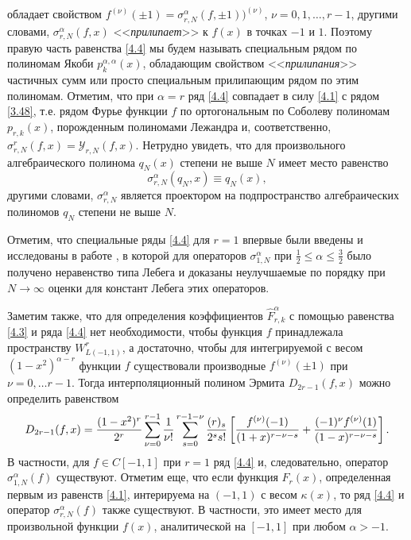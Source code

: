 обладает свойством $f^{(\nu)}(\pm1)=\sigma_{r,N}^\alpha(f,\pm1))^{(\nu)}$, $\nu=0,1,\ldots, r-1$, другими словами, $\sigma_{r,N}^\alpha(f,x)$ <<\textit{прилипает}>> к $f(x)$ в точках $-1$ и $1$. Поэтому правую часть  равенства \eqref{4.4} мы будем называть специальным рядом по полиномам Якоби $p_{k}^{\alpha,\alpha}(x)$, обладающим свойством <<\textit{прилипания}>> частичных сумм или просто специальным прилипающим рядом по этим  полиномам.  Отметим, что при $\alpha=r$ ряд \eqref{4.4} совпадает в силу \eqref{4.1} с рядом \eqref{3.48}, т.е. рядом Фурье функции $f$ по ортогональным по Соболеву полиномам $p_{r,k}(x)$, порожденным полиномами Лежандра и, соответственно, $\sigma_{r,N}^r(f,x)=\mathcal{ Y}_{r,N}(f,x)$. Нетрудно увидеть, что для произвольного алгебраического полинома $q_N(x)$ степени не выше $N$ имеет место равенство
\begin{equation}\label{4.6}
\sigma_{r,N}^\alpha(q_N,x)\equiv q_N(x),
\end{equation}
другими словами, $\sigma_{r,N}^\alpha$ является проектором на подпространство алгебраических полиномов $q_N$ степени не выше $N$.

Отметим, что специальные ряды \eqref{4.4} для $r=1$ впервые были введены и исследованы в работе \cite{sharap3}, в которой для операторов $\sigma_{1,N}^\alpha$  при $\frac12\le \alpha\le\frac32$ было получено неравенство типа Лебега и доказаны неулучшаемые по порядку при $N\to\infty$ оценки для констант Лебега этих операторов.

Заметим также, что для определения коэффициентов $\hat F^\alpha_{r,k}$  с помощью равенства \eqref{4.3} и ряда \eqref{4.4} нет необходимости, чтобы функция $f$ принадлежала пространству $W^r_{L(-1,1)}$, а достаточно, чтобы для интегрируемой с весом $(1-x^2)^{\alpha-r}$ функции $f$ существовали производные $f^{(\nu)}(\pm1)$ при $\nu=0,\ldots r-1$. Тогда  интерполяционный полином Эрмита $D_{2r-1}(f,x)$ можно определить равенством
\begin{equation}\label{4.7}
D_{2r-1}(f,x)=
{(1-x^2)^r\over2^r}\sum_{\nu=0}^{r-1}{1\over\nu!}
\sum_{s=0}^{r-1-\nu}{(r)_s\over2^ss!}\left[{f^{(\nu)}(-1)\over(1+x)^{r-\nu-s}}+
{(-1)^\nu f^{(\nu)}(1)\over(1-x)^{r-\nu-s}}\right].
\end{equation}
В частности, для $f\in C[-1,1]$ при $r=1$ ряд \eqref{4.4} и, следовательно,  оператор $\sigma_{1,N}^\alpha(f)$ существуют. Отметим еще, что если функция $F_r(x)$, определенная первым из равенств \eqref{4.1}, интерируема на $(-1,1)$ с весом $\kappa(x)$, то ряд \eqref{4.4} и оператор $\sigma_{r,N}^\alpha(f)$ также существуют. В частности, это имеет место для  произвольной функции $f(x)$, аналитической на $[-1,1]$ при любом $\alpha>-1$.





